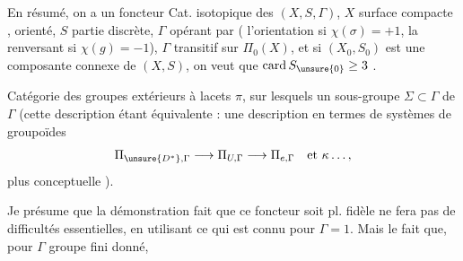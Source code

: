 En résumé, on a un foncteur 
Cat. isotopique des \((X,S,\Gamma)\), \(X\) surface compacte ,
\unsure{\(\Gamma\)} orienté, \(S\) partie discrète, \(\Gamma\) opérant par 
(\inserted{\(\sigma\in\Gamma\)} l'orientation si \(\chi(\sigma)=+1\), la renversant
si \(\chi(g)=-1\)), \(\Gamma\) transitif sur \(\Pi_0(X)\),
 et si \((X_0,S_0)\) est une composante connexe
de \((X,S)\), on veut que 
 \(\operatorname{card} S_{\unsure{0}}\geq 3\) .


Catégorie des groupes extérieurs à \inserted{\(\Gamma\)-}lacets \(\pi\),
sur lesquels un sous-groupe \(\Sigma\subset\Gamma\) de \(\Gamma\) 
(cette description étant
équivalente : une description en termes
de systèmes de groupoïdes
\[
\Pi_{\unsure{D^*},\Gamma}\longrightarrow\Pi_{U,\Gamma}
\longrightarrow\Pi_{e,\Gamma}\quad\text{et }\kappa\ldots,
\]
plus conceptuelle  ).

 Je présume que la démonstration
 fait que ce foncteur soit pl. fidèle
ne fera pas de difficultés essentielles,
en utilisant ce qui est connu pour
\(\Gamma=1\). Mais le fait que, pour \(\Gamma\) groupe
fini donné, 

